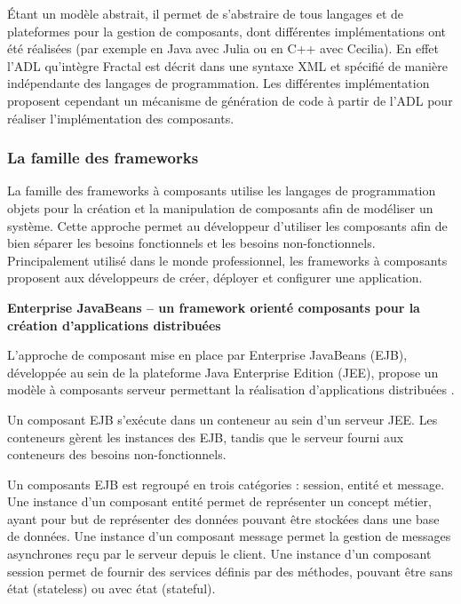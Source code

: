         Étant un modèle abstrait, il permet de s'abstraire de tous langages et de plateformes pour la gestion de composants, dont différentes implémentations ont été réalisées (par exemple en Java avec Julia ou en C++ avec Cecilia). En effet l'ADL qu’intègre Fractal est décrit dans une syntaxe XML et spécifié de manière indépendante des langages de programmation. Les différentes implémentation proposent cependant un mécanisme de génération de code à partir de l'ADL pour réaliser l'implémentation des composants. \\\par

    \subsubsection{La famille des frameworks}     
   
    La famille des frameworks à composants utilise les langages de programmation objets pour la création et la manipulation de composants afin de modéliser un système. Cette approche permet au développeur d'utiliser les composants afin de bien séparer les besoins fonctionnels et les besoins non-fonctionnels. Principalement utilisé dans le monde professionnel, les frameworks à composants proposent aux développeurs de créer, déployer et configurer une application.  \\\par
    
    \textbf{Enterprise JavaBeans -- un framework orienté composants pour la création d'applications distribuées} 
    
    L'approche de composant mise en place par Enterprise JavaBeans (EJB), développée au sein de la plateforme Java Enterprise Edition (JEE), propose un modèle à composants serveur permettant la réalisation d'applications distribuées \cite{specificationejb}.
    
    Un composant EJB s’exécute dans un conteneur au sein d'un serveur JEE. Les conteneurs gèrent les instances des EJB, tandis que le serveur fourni aux conteneurs des besoins non-fonctionnels.
    
    Un composants EJB est regroupé en trois catégories : session, entité et message. Une instance d'un composant entité permet de représenter un concept métier, ayant pour but de représenter des données pouvant être stockées dans une base de données. Une instance d'un composant message permet la gestion de messages asynchrones reçu par le serveur depuis le client. Une instance d'un composant session permet de fournir des services définis par des méthodes, pouvant être sans état (stateless) ou avec état (stateful).
    
